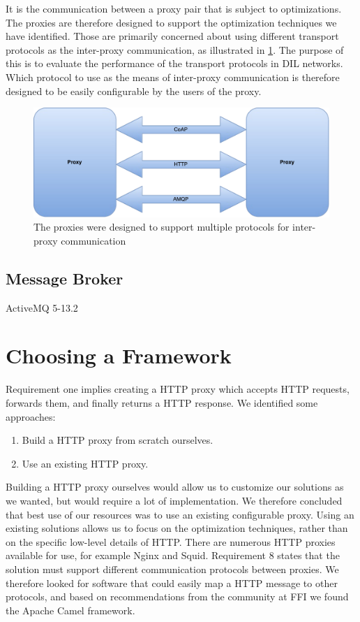 It is the communication between a proxy pair that is subject to optimizations.
The proxies are therefore designed to support the optimization techniques we
have identified. Those are primarily concerned about using different transport
protocols as the inter-proxy communication, as illustrated in
\cref{figure:proxy-communication}. The purpose of this is to evaluate the
performance of the transport protocols in DIL networks. Which protocol to use as
the means of inter-proxy communication is therefore designed to be easily
configurable by the users of the proxy.

\begin{figure}[h]
\includegraphics[scale=0.5]{images/proxy_communcation.pdf}
\caption{The proxies were designed to support multiple protocols for inter-proxy communication}
\label{figure:proxy-communication}
\end{figure}

\subsection{Message Broker}

ActiveMQ 5-13.2

\section{Choosing a Framework}

Requirement one implies creating a HTTP proxy which accepts HTTP requests,
forwards them, and finally returns a HTTP response. We identified some
approaches:

\begin{enumerate}
    \item Build a HTTP proxy from scratch ourselves.
    \item Use an existing HTTP proxy.
\end{enumerate}

Building a HTTP proxy ourselves would allow us to customize our solutions as we
wanted, but would require a lot of implementation. We therefore concluded that
best use of our resources was to use an existing configurable proxy. Using an
existing solutions allows us to focus on the optimization techniques, rather
than on the specific low-level details of HTTP. There are numerous HTTP proxies
available for use, for example Nginx\cite{nginx-homepage} and
Squid\cite{squid-homepage}. Requirement 8 states that the solution must support
different communication protocols between proxies. We therefore looked for
software that could easily map a HTTP message to other protocols, and based on
recommendations from the community at FFI we found the Apache Camel framework.

